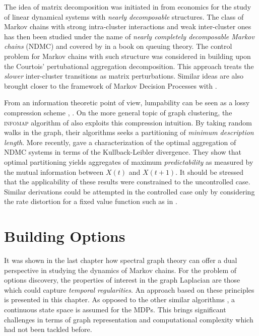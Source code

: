 \documentclass[12pt, oneside, extrafontsizes]{memoir}  %
\newcommand{\mdps}{Markov Decision Processes\xspace}
\theoremstyle{plain}
\theoremstyle{definition}
\begin{document}
The idea of matrix decomposition was initiated in \cite{AndoFisher1963} from
economics for the study of linear dynamical systems with \textit{nearly decomposable}
structures. The class of Markov chains with strong intra-cluster interactions and weak
inter-cluster ones has then been studied under the name of \textit{nearly completely
decomposable Markov chains} (NDMC) \cite{Gaitsgori1975} and covered by
\cite{Courtois1977} in a book on queuing theory. The control problem for Markov chains
with such structure was considered in \cite{Teneketzis1980, Delebecque1981,
Phillips1981, Coderch1983} building upon the Courtois' pertubational aggregation
decomposition. This approach treats the \textit{slower} inter-cluster transitions as
matrix perturbations. Similar ideas are also brought closer to the framework of \mdps
with \cite{Haviv1985, Aldhaheri1991, Zhang1997}. 

From an information theoretic point of view, lumpability can be seen as a lossy
compression scheme \cite{Lindqvist1978}, \cite{Watanabe1960}. On the more general
topic of graph clustering, the  \textsc{infomap} algorithm of \cite{Rosvall2008} also
exploits this compression intuition. By taking random walks in the graph, their
algorithms seeks a partitioning of \textit{minimum description length}. More recently,
\cite{Deng2011} gave a characterization of the optimal aggregation of NDMC systems in
terms of the Kullback-Leibler divergence. They show that optimal partitioning yields
aggregates of maximum \textit{predictability} as measured by the mutual information
between $X(t)$ and $X(t+1)$. It should be stressed that the applicability of these results
were constrained to the uncontrolled case. Similar derivations could be attempted in the
controlled case only by considering the rate distortion for a fixed value function such as
in \cite{Still2012}.

\chapter{Building Options}

It was shown in the last chapter how spectral graph theory can offer a dual perspective
in studying the dynamics of Markov chains. For the problem of options discovery, the
properties of interest in the graph Laplacian are those which could capture
\textit{temporal regularities}. An approach based on these principles is presented in this chapter. As opposed to the other similar algorithms \cite{Menache2002, Mannor2004, Mathew2012, Bouvrie2012}, a continuous state space is assumed for the MDPs. This brings significant challenges in terms of graph representation and computational complexity which had not been tackled before.
\end{document}
